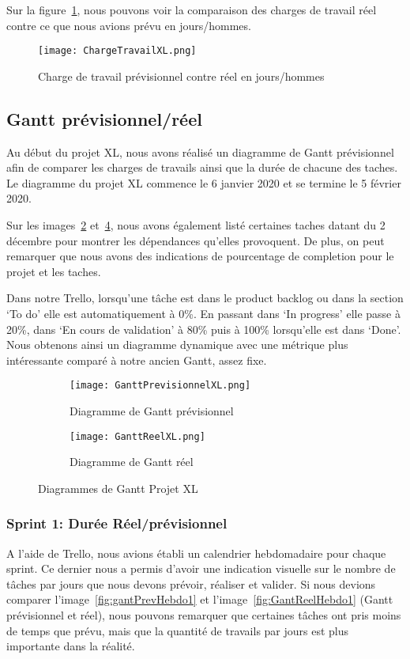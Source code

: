 Sur la figure~\ref{fig:chargeReel}, nous pouvons voir la comparaison des charges de travail réel contre ce que nous avions prévu en jours/hommes.

\begin{figure}[h!]
  \centering
  \texttt{[image: ChargeTravailXL.png]}
	\caption[]{Charge de travail prévisionnel contre réel en jours/hommes}
	\label{fig:chargeReel}
\end{figure}



\subsection{Gantt prévisionnel/réel}
Au début du projet XL, nous avons réalisé un diagramme de Gantt prévisionnel afin de comparer les charges de travails ainsi que la durée de chacune des taches.
Le diagramme du projet XL commence le 6 janvier 2020 et se termine le 5 février 2020. 

Sur les images~\ref{fig:gantXLprev} et~\ref{fig:gantXLreel}, nous avons également listé certaines taches datant du 2 décembre pour montrer les dépendances qu'elles provoquent.
De plus, on peut remarquer que nous avons des indications de pourcentage de completion pour le projet et les taches.

Dans notre Trello, lorsqu'une tâche est dans le product backlog ou dans la section `To do' elle est automatiquement à 0\%.
En passant dans `In progress' elle passe à 20\%, dans `En cours de validation' à 80\% puis à 100\% lorsqu'elle est dans `Done'.
Nous obtenons ainsi un diagramme dynamique avec une métrique plus intéressante comparé à notre ancien Gantt, assez fixe.

\begin{figure}
   \centering
   \begin{subfigure}{.5\textwidth}
     \centering
     \texttt{[image: GanttPrevisionnelXL.png]}
   	\caption{Diagramme de Gantt prévisionnel}
   	\label{fig:gantXLprev}
   \end{subfigure}%
   \begin{subfigure}{.5\textwidth}
     \centering
     \texttt{[image: GanttReelXL.png]}
   	\caption{Diagramme de Gantt réel}
   	\label{fig:gantXLreel}
   \end{subfigure}
   \caption{Diagrammes de Gantt Projet XL}
\end{figure}

\subsubsection{Sprint 1: Durée Réel/prévisionnel}
A l'aide de Trello, nous avions établi un calendrier hebdomadaire pour chaque sprint.
Ce dernier nous a permis d’avoir une indication visuelle sur le nombre de tâches par jours que nous devons prévoir, réaliser et valider.
Si nous devions comparer l'image~\ref{fig:gantPrevHebdo1} et l'image~\ref{fig:GantReelHebdo1} (Gantt prévisionnel et réel), nous pouvons remarquer que certaines tâches ont pris moins de temps que prévu, mais que la quantité de travails par jours est plus importante dans la réalité.


